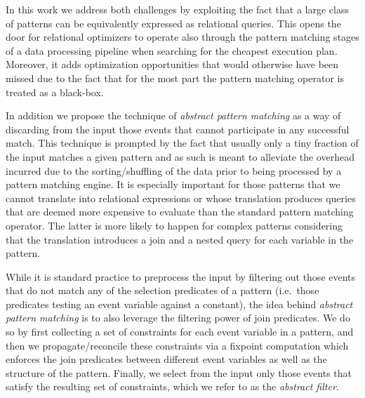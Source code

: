 In this work we address both challenges by exploiting the fact that a large 
class of patterns can be equivalently expressed as relational queries.
This opens the door for relational optimizers to operate also through 
the pattern matching stages of a data processing pipeline when searching for 
the cheapest execution plan.
Moreover, it adds optimization opportunities that would otherwise have been 
missed due to the fact that for the most part the  pattern matching operator is 
treated as a black-box.



In addition we propose the technique of {\em abstract pattern matching} as a 
way of discarding from the input those events that cannot participate in any 
successful match. This technique is prompted by the fact that usually only a 
tiny fraction of the input matches a given pattern and as such is meant to 
alleviate the overhead incurred due to the sorting/shuffling of the data prior 
to being processed by a pattern matching engine.
It is especially important for those patterns that we cannot 
translate into relational expressions or whose translation produces queries 
that are deemed more expensive to evaluate than the standard pattern matching 
operator. 
The latter is more likely to happen for complex patterns considering that the 
translation introduces a join and a nested query for each variable in the 
pattern. 

While it is standard practice to preprocess the input by filtering out those 
events that do not match any of the selection predicates of a pattern (i.e.\ 
those predicates testing an event variable against a constant), the idea behind 
{\em abstract pattern matching} is to also leverage the filtering power of join 
predicates.
We do so by first collecting a set of constraints for each event variable in a 
pattern, and then we propagate/reconcile these constraints via a fixpoint 
computation which enforces the join predicates between different event 
variables as well as the structure of the pattern. 
Finally, we select from the input only those events that satisfy the resulting 
set of constraints, which we refer to as the {\em abstract filter}.  

